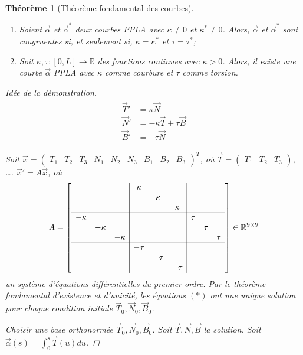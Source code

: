 \documentclass{report}
\newtheorem*{thm}{Th\'eor\`eme}
\theoremstyle{definition}
\theoremstyle{remark}
\newenvironment*{subproof}[1][D\'emonstration]
{
\begin{proof}[#1]

}
{
\renewcommand{\qedsymbol}{$\blacksquare$}
\end{proof}
\renewcommand{\qedsymbol}{$\square$}
}
\def\RR{\mathbb{R}}
\begin{document}
	\begin{thm}[Th\'eor\`eme fondamental des courbes]~

		\begin{enumerate}
			\item Soient $\vec\alpha$ et $\vec\alpha^*$ deux courbes PPLA avec $\kappa\neq0$ et $\kappa^*\neq0$. Alors, $\vec\alpha$ et $\vec\alpha^*$ sont congruentes si, et seulement si, $\kappa=\kappa^*$ et $\tau=\tau^*$;
			\item Soit $\kappa,\tau:[0,L]\to\RR$ des fonctions continues avec $\kappa>0$. Alors, il existe une courbe $\vec\alpha$ PPLA avec $\kappa$ comme courbure et $\tau$ comme torsion.
		\end{enumerate}
		\begin{subproof}[Id\'ee de la d\'emonstration]
			\begin{align*}
				\begin{split}
					\vec T'&= \kappa\vec N\\
					\vec N'&= -\kappa\vec T+\tau\vec B\\
					\vec B'&= -\tau\vec N
				\end{split}\tag{$*$}
			\end{align*}

			Soit $\vec x = \begin{pmatrix}
				T_1&T_2&T_3&N_1&N_2&N_3&B_1&B_2&B_3
			\end{pmatrix}^T$, o\`u $\vec T=\begin{pmatrix}
				T_1&T_2&T_3
			\end{pmatrix}$, \dots. $\vec x'=A\vec x$, o\`u \[ A = \left[\begin{array}{ccc|ccc|ccc}
				&&&\kappa&&&&&\\
				&&&&\kappa&&&&\\
				&&&&&\kappa\\\hline
				-\kappa&&&&&&\tau\\
				&-\kappa&&&&&&\tau\\
				&&-\kappa&&&&&&\tau\\\hline
				&&&-\tau&&&&&\\
				&&&&-\tau&&&&\\
				&&&&&-\tau&&&
			\end{array}\right] \in \RR^{9\times9} \]
			un syst\`eme d'\'equations diff\'erentielles du premier ordre. Par le th\'eor\`eme fondamental d'existence et d'unicit\'e, les \'equations $(*)$ ont une unique solution pour chaque condition initiale $\vec T_0, \vec N_0, \vec B_0$.

			Choisir une base orthonorm\'ee $\vec T_0, \vec N_0, \vec B_0$. Soit $\vec T, \vec N, \vec B$ la solution. Soit $\vec\alpha(s)=\int_{0}^{s}\vec T(u)du$.
		\end{subproof}
	\end{thm}
\end{document}
